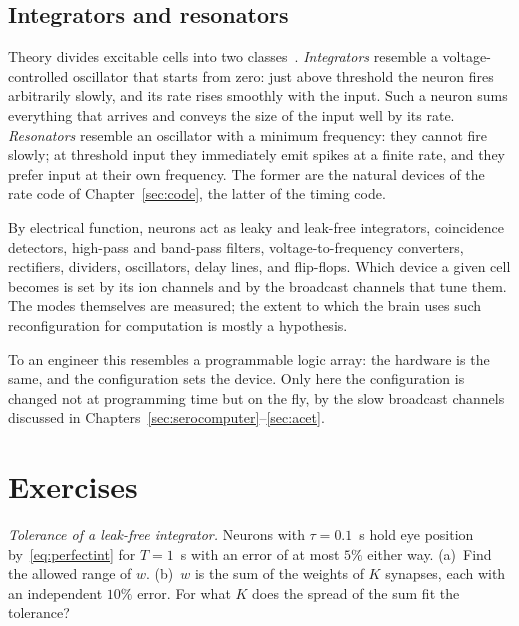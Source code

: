 \subsection{Integrators and resonators}

Theory divides excitable cells into two classes~\cite{Izhikevich2007}. \emph{Integrators} resemble a voltage-controlled oscillator that starts from zero: just above threshold the neuron fires arbitrarily slowly, and its rate rises smoothly with the input. Such a neuron sums everything that arrives and conveys the size of the input well by its rate. \emph{Resonators} resemble an oscillator with a minimum frequency: they cannot fire slowly; at threshold input they immediately emit spikes at a finite rate, and they prefer input at their own frequency. The former are the natural devices of the rate code of Chapter~\ref{sec:code}, the latter of the timing code.

\begin{keyblock}
\begin{proposition}
\label{prop:eetypes}
By electrical function, neurons act as leaky and leak-free integrators, coincidence detectors, high-pass and band-pass filters, voltage-to-frequency converters, rectifiers, dividers, oscillators, delay lines, and flip-flops. Which device a given cell becomes is set by its ion channels and by the broadcast channels that tune them. The modes themselves are measured; the extent to which the brain uses such reconfiguration for computation is mostly a hypothesis.
\end{proposition}
\end{keyblock}

To an engineer this resembles a programmable logic array: the hardware is the same, and the configuration sets the device. Only here the configuration is changed not at programming time but on the fly, by the slow broadcast channels discussed in Chapters~\ref{sec:serocomputer}--\ref{sec:acet}.

\section{Exercises}

\begin{exercise}[\lvlA]
\label{ex:18:1}
\emph{Tolerance of a leak-free integrator.} Neurons with $\tau=0.1$~s hold eye position by~\eqref{eq:perfectint} for $T=1$~s with an error of at most $5\%$ either way. (a)~Find the allowed range of $w$. (b)~$w$ is the sum of the weights of $K$ synapses, each with an independent $10\%$ error. For what $K$ does the spread of the sum fit the tolerance?
\end{exercise}

